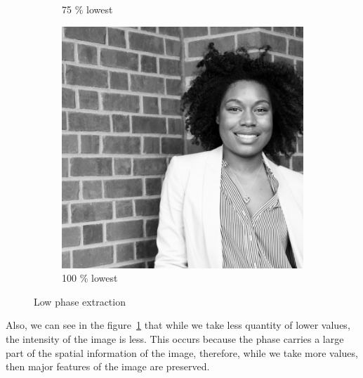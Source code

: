 \begin{figure}[h!]
\begin{subfigure}{0.2\textwidth}
  \caption{75 \% lowest}
\end{subfigure}%
\begin{subfigure}{0.2\textwidth}
  \centering
  \includegraphics[width=0.95\linewidth]{output/phase_low_100.jpg}
  \caption{100 \% lowest}
\end{subfigure}%
 \caption{Low phase extraction}
\label{fig:low-phase}
\end{figure}

Also, we can see in the figure~\ref{fig:low-phase} that while we take less quantity of lower values, the intensity of the image is less. This occurs because the phase carries a large part of the spatial information of the image, therefore, while we take more values, then major features of the image are preserved.


